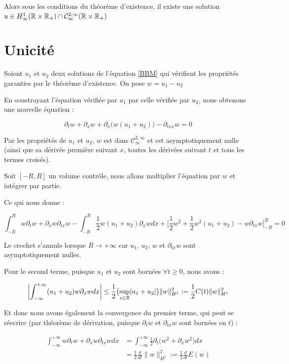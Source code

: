 Alors sous les conditions du théorème d'existence, il existe une solution $u \in H^1_{\infty} (\mathbb{R}\times \mathbb{R}_+) \cap \mathcal{C}^{2,\infty}_{\infty}(\mathbb{R} \times \mathbb{R}_+)$

\section{Unicité}


Soient $u_1$ et $u_2$ deux solutions de l'équation \ref{BBM} qui vérifient les propriétés garanties
par le théorème d'existence.
On pose $w = u_1 - u_2$

En soustrayant l'équation vérifiée par $u_1$ par celle vérifiée par $u_2$, nous obtenons une nouvelle équation :

$$ \partial_t w + \partial_x w + \partial_x \bigl( w(u_1 + u_2) \bigr) - \partial_{txx}w = 0 $$


Par les propriétés de $u_1$ et $u_2$, $w$ est dans $\mathcal{C}^{2,\infty}_{\infty}$ et est asymptotiquement nulle (ainsi que sa dérivée première suivant $x$, toutes les dérivées suivant $t$ et tous les termes croisés).

Soit $[-R,R]$ un volume contrôle, nous allons multiplier l'équation par $w$ et intégrer par partie. 

Ce qui nous donne :

$$\int_{-R}^{R} w\partial_t w + \partial_x w \partial_{tx} w - \int_{-R}^{R} \frac{1}{2}w(u_1 + u_2)\partial_x w dx + \big[ \frac{1}{2}w^2 + \frac{1}{2} w^2 (u_1 + u_2) - w\partial_{tx}w \big]_{-R}^{R} = 0 $$

Le crochet s'annule lorsque $R \longrightarrow +\infty$ car $u_1$, $u_2$, $w$ et $\partial_{tx}w$ sont asymptotiquement nulles.

Pour le second terme, puisque $u_1$ et $u_2$ sont bornées $\forall t \geq 0$, nous avons : 

$$\biggl| \int_{-\infty}^{+\infty} (u_1 + u_2)w\partial_x w dx\biggr| \leq \frac{1}{2} \bigl( \underset{x \in \mathbb{R}}{\sup} |u_1 + u_2| \bigr) \|w\|_{H^1}^2 := \frac{1}{2}C(t) \|w\|_{H^1}^2 $$

Et donc nous avons également la convergence du premier terme, qui peut se réecrire (par théorème de dérivation, puisque $\partial_t w$ et $\partial_{tx} w$ sont bornées en $t$) :

\begin{equation*}
\begin{split}
    \int_{-\infty}^{+\infty} w \partial_t w + \partial_x w \partial_{tx}w dx &= \int_{-\infty}^{+\infty} \frac{1}{2} \partial_t \bigl( w^2 + \partial_x w ^2 \bigr) dx \\
    &= \frac{1}{2} \frac{d}{dt} \|w\|_{H^1}^2 := \frac{1}{2} \frac{d}{dt} E(w)
\end{split}
\end{equation*}

